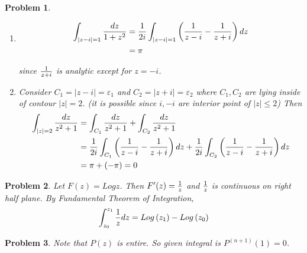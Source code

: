 \documentclass{oblivoir}
\newtheorem{problem}{Problem}
\begin{document}
\begin{problem}
	\begin{enumerate}[label = (\alph*)]
		\item \begin{equation}
				\begin{split}
					\int_{|z-i|=1}\frac{dz}{1+z^2} & = {1\over 2i}\int_{|z-i|=1}\left( {1\over z-i} - {1\over z+i} \right)dz \\
					& = \pi
				\end{split}
				\label{<+label+>}
			\end{equation}

			since ${1\over z+i}$ is analytic except for $z = -i$.

		\item Consider $C_1 = |z-i|=\varepsilon_1$ and $C_2 = |z+i| = \varepsilon_2$ where $C_1, C_2$ are lying inside of contour $|z| = 2$. (it is possible since $i, -i$ are interior point of $|z| \leq 2$)
			Then
			\begin{equation}
				\begin{split}
					\int_{|z| = 2} \frac{dz}{z^2 + 1} & = \int_{C_1}\frac{dz}{z^2 + 1} + \int_{C_2} \frac{dz}{z^2 + 1} \\
					& = {1\over 2i} \int_{C_1}\left( {1\over z-i} - {1\over z+i} \right)dz + {1\over 2i} \int_{C_2}\left( {1\over z-i} - {1 \over z+i} \right)dz \\
					& = \pi + \left( -\pi \right) = 0
				\end{split}
				\label{<+label+>}
			\end{equation}
	\end{enumerate}
\end{problem}

\begin{problem}
	Let $F(z) = Log z$. Then $F'(z) = {1 \over z}$ and ${1 \over z}$ is continuous on right half plane. By Fundamental Theorem of Integration, 
	\begin{equation}
		\int_{z_0}^{z_1} {1\over z}dz = Log\left( z_1 \right) - Log\left( z_0 \right)
		\label{<+label+>}
	\end{equation}
\end{problem}

\begin{problem}
	Note that $P(z)$ is entire. So given integral is $P^{\left( n+1 \right)}\left( 1 \right) = 0$.
\end{problem}
\end{document}
